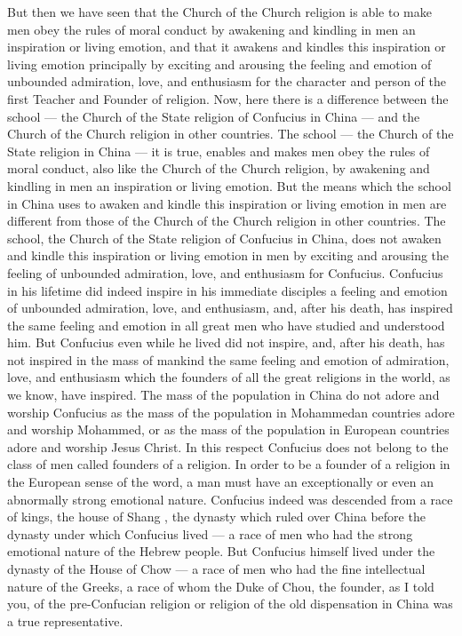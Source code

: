 But then we  have seen that the Church of the Church religion is able to make men obey the rules of moral conduct by awakening and kindling in men an inspiration or living emotion, and that it awakens and kindles this inspiration or living emotion principally by exciting and arousing the feeling and emotion of unbounded admiration, love, and enthusiasm for the character and person of the first Teacher and Founder of religion.
Now, here there is a difference between the school --- the Church of the State religion of Confucius in China --- and the Church of the Church religion in other countries.
The school --- the Church of the State religion in China --- it is true, enables and makes men obey the rules of moral conduct, also like the Church of the Church religion, by awakening and kindling in men an inspiration or living emotion.
But the means which the school in China uses to awaken and kindle this inspiration or living emotion in men are different from those of the Church of the Church religion in other countries.
The school, the Church of the State religion of Confucius in China, does not awaken and kindle this inspiration or living emotion in men by exciting and arousing the feeling of unbounded admiration, love, and enthusiasm for Confucius.
Confucius in his lifetime did indeed inspire in his immediate disciples a feeling and emotion of unbounded admiration, love, and enthusiasm, and, after his death, has inspired the same feeling and emotion in all great men who have studied and understood him.
But Confucius even while he lived did not inspire, and, after his death, has not inspired in the mass of mankind the same feeling and emotion of admiration, love, and enthusiasm which the founders of all the great religions in the world, as we know, have inspired.
The mass of the population in China do not adore and worship Confucius as the mass of the population in Mohammedan countries adore and worship Mohammed, or as the mass of the population in European countries adore and worship Jesus Christ.
In this respect Confucius does not belong to the class of men called founders of a religion.
In order to be a founder of a religion in the European sense of the word, a man must have an exceptionally or even an abnormally strong emotional nature.
Confucius indeed was descended from a race of kings, the house of Shang , the dynasty which ruled over China before the dynasty under which Confucius lived --- a race of men who had the strong emotional nature of the Hebrew people.
But Confucius himself lived under the dynasty of the House of Chow  --- a race of men who had the fine intellectual nature of the Greeks, a race of whom the Duke of Chou, the founder, as I told you, of the pre-Confucian religion or religion of the old dispensation in China was a true representative.
